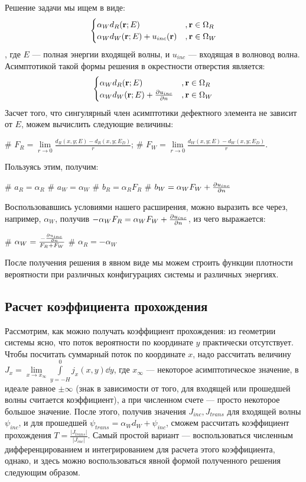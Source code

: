 Решение задачи мы ищем в виде:
\[
\begin{cases}
\alpha_W d_R(\vb{r}; E) &, \vb{r} \in \Omega_R \\
\alpha_W d_W(\vb{r}; E) + u_{inc}(\vb{r})&, \vb{r} \in \Omega_W
\end{cases}
\], где $E$ — полная энергии входящей волны, и $u_{inc}$ — входящая в волновод волна. Асимптотикой такой формы решения в окрестности отверстия является:
\[
\begin{cases}
\alpha_W d_R(\vb{r}; E) &, \vb{r} \in \Omega_R \\
\alpha_W d_W(\vb{r}; E) + \pdv{u_{inc}}{n} (\vb{r}) &, \vb{r} \in \Omega_W
\end{cases}
\]
Засчет того, что сингулярный член асимптотики дефектного элемента не зависит от $E$, можем вычислить следующие величины:
\begin{ilist}
# $F_R = \lim\limits_{r \to 0} \frac{d_R(x, y; E) - d_R(x, y; E_D)}{r}$;
# $F_W = \lim\limits_{r \to 0} \frac{d_W(x, y; E) - d_W(x, y; E_D)}{r}$.
\end{ilist}

Пользуясь этим, получим:
\begin{ilist}
# $a_R = \alpha_R$
# $a_W = \alpha_W$
# $b_R = \alpha_R F_R$
# $b_W = \alpha_W F_W + \pdv{u_{inc}}{n} (\vb{0})$
\end{ilist}

Воспользовавшись условиями нашего расширения, можно выразить все через, например, $\alpha_W$, получив $-\alpha_W F_R = \alpha_W F_W  + \pdv{u_{inc}}{n} (\vb{0})$, из чего выражается:
\begin{ilist}
# $\alpha_W = \frac{-\pdv{u_{inc}}{n} (\vb{0})}{F_R + F_W}$
# $\alpha_R = - \alpha_W$
\end{ilist}

После получения решения в явном виде мы можем строить функции плотности вероятности при различных конфигурациях системы и различных энергиях.

\subsection{Расчет коэффициента прохождения}
Рассмотрим, как можно получать коэффициент прохождения: из геометрии системы ясно, что поток вероятности по координате $y$ практически отсутствует. Чтобы посчитать суммарный поток по координате $x$, надо рассчитать величину $J_x = \lim\limits_{x \to x_\infty} \int\limits_{y = -H}^0 j_x(x, y) \dd{y}$, где $x_\infty$ — некоторое асимптотическое значение, в идеале равное $\pm \infty$ (знак в зависимости от того, для входящей или прошедшей волны считается коэффициент), а при численном счете — просто некоторое большое значение. После этого, получив значения $J_{inc}, J_{trans}$ для входящей волны $\psi_{inc}$, и для прошедшей $\psi_{trans} = \alpha_W d_W + \psi_{inc}$, сможем рассчитать коэффициент прохождения $T = \frac{|J_{trans}|}{|J_{inc}|}$. Самый простой вариант — воспользоваться численным дифференцированием и интегрированием для расчета этого коэффициента, однако, и здесь можно воспользоваться явной формой полученного решения следующим образом.

